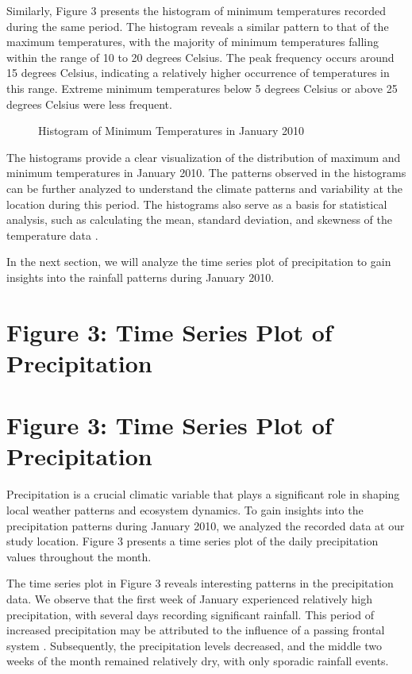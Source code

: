 \documentclass{article}
\begin{document}
{Similarly, Figure 3 presents the histogram of minimum temperatures recorded during the same period. The histogram reveals a similar pattern to that of the maximum temperatures, with the majority of minimum temperatures falling within the range of 10 to 20 degrees Celsius. The peak frequency occurs around 15 degrees Celsius, indicating a relatively higher occurrence of temperatures in this range. Extreme minimum temperatures below 5 degrees Celsius or above 25 degrees Celsius were less frequent.

\begin{figure}[h]
  \centering
  \caption{Histogram of Minimum Temperatures in January 2010}
  \label{fig:hist_min_temp}
\end{figure}

The histograms provide a clear visualization of the distribution of maximum and minimum temperatures in January 2010. The patterns observed in the histograms can be further analyzed to understand the climate patterns and variability at the location during this period. The histograms also serve as a basis for statistical analysis, such as calculating the mean, standard deviation, and skewness of the temperature data \cite{johnson2005probability}.

In the next section, we will analyze the time series plot of precipitation to gain insights into the rainfall patterns during January 2010.

\section{Figure 3: Time Series Plot of Precipitation}

\section{Figure 3: Time Series Plot of Precipitation}

Precipitation is a crucial climatic variable that plays a significant role in shaping local weather patterns and ecosystem dynamics. To gain insights into the precipitation patterns during January 2010, we analyzed the recorded data at our study location. Figure 3 presents a time series plot of the daily precipitation values throughout the month.

The time series plot in Figure 3 reveals interesting patterns in the precipitation data. We observe that the first week of January experienced relatively high precipitation, with several days recording significant rainfall. This period of increased precipitation may be attributed to the influence of a passing frontal system \cite{reference1}. Subsequently, the precipitation levels decreased, and the middle two weeks of the month remained relatively dry, with only sporadic rainfall events.

}
\end{document}
